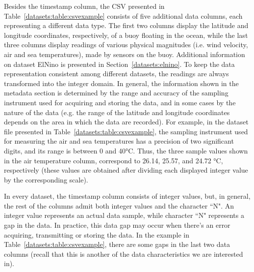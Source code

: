Besides the timestamp column, the CSV presented in Table~\ref{datasets:table:csvexample} consists of five additional data columns, each representing a different data type. The first two columns display the latitude and longitude coordinates, respectively, of a buoy floating in the ocean, while the last three columns display readings of various physical magnitudes (i.e. wind velocity, air and sea temperatures), made by sensors on the buoy. Additional information on dataset ElNino \cite{dataset:elnino} is presented in Section~\ref{datasets:elnino}. To keep the data representation consistent among different datasets, the readings are always transformed into the integer domain. In general, the information shown in the metadata section is determined by the range and accuracy of the sampling instrument used for acquiring and storing the data, and in some cases by the nature of the data (e.g. the range of the latitude and longitude coordinates depends on the area in which the data are recorded). For example, in the dataset file presented in Table~\ref{datasets:table:csvexample}, the sampling instrument used for measuring the air and sea temperatures has a precision of two significant digits, and its range is between 0 and 40°C. Thus, the three sample values shown in the air temperature column, correspond to 26.14, 25.57, and 24.72 °C, respectively (these values are obtained after dividing each displayed integer value by the corresponding scale). 


In every dataset, the timestamp column consists of integer values, but, in general, the rest of the columns admit both integer values and the character ``N". An integer value represents an actual data sample, while character ``N" represents a gap in the data. In practice, this data gap may occur when there's an error acquiring, transmitting or storing the data. In the example in Table~\ref{datasets:table:csvexample}, there are some gaps in the last two data columns (recall that this is another of the data characteristics we are interested in).

